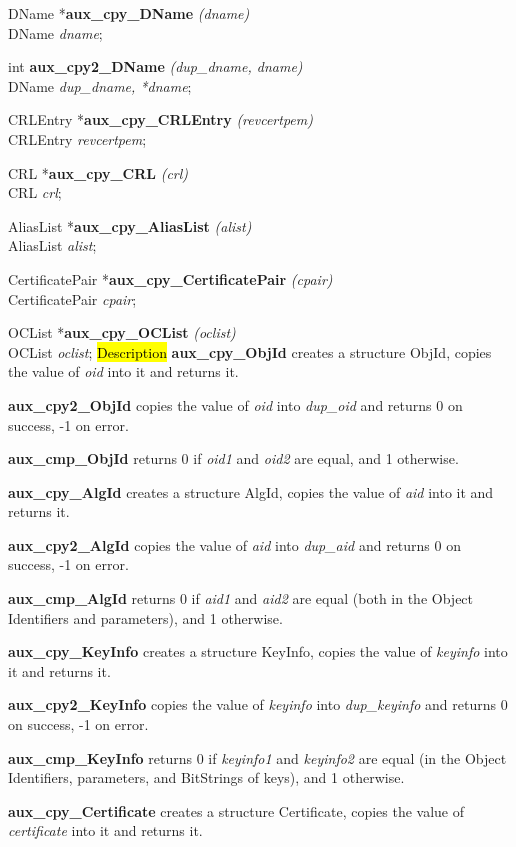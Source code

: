 DName *{\bf aux\_cpy\_DName} {\em  (dname)} \\
DName {\em *dname};

int {\bf aux\_cpy2\_DName} {\em (dup\_dname, dname)} \\
DName {\em *dup\_dname, *dname};

CRLEntry *{\bf aux\_cpy\_CRLEntry} {\em  (revcertpem)} \\
CRLEntry {\em *revcertpem};

CRL *{\bf aux\_cpy\_CRL} {\em  (crl)} \\
CRL {\em *crl};

AliasList *{\bf aux\_cpy\_AliasList} {\em  (alist)} \\
AliasList {\em *alist};

CertificatePair *{\bf aux\_cpy\_CertificatePair} {\em  (cpair)} \\
CertificatePair {\em *cpair};

OCList *{\bf aux\_cpy\_OCList} {\em  (oclist)} \\
OCList {\em *oclist};
\hl{Description}
{\bf aux\_cpy\_ObjId} creates a structure ObjId, copies the value
of {\em oid} into it and returns it.
                   
{\bf aux\_cpy2\_ObjId} copies the value of {\em oid} into {\em dup\_oid}
and returns 0 on success, -1 on error.

{\bf aux\_cmp\_ObjId} returns 0 if {\em oid1} and {\em oid2} are equal,
and 1 otherwise.

{\bf aux\_cpy\_AlgId} creates a structure AlgId, copies the value
of {\em aid} into it and returns it.

{\bf aux\_cpy2\_AlgId} copies the value of {\em aid} into {\em dup\_aid}
and returns 0 on success, -1 on error.

{\bf aux\_cmp\_AlgId} returns 0 if {\em aid1} and {\em aid2} are equal
(both in the Object Identifiers and parameters),
and 1 otherwise.

{\bf aux\_cpy\_KeyInfo} creates a structure KeyInfo, copies the value
of {\em keyinfo} into it and returns it.

{\bf aux\_cpy2\_KeyInfo} copies the value of {\em keyinfo} into {\em dup\_keyinfo}
and returns 0 on success, -1 on error.

{\bf aux\_cmp\_KeyInfo} returns 0
if {\em keyinfo1} and {\em keyinfo2} are equal
(in the Object Identifiers, parameters, and BitStrings of keys),
and 1 otherwise.

{\bf aux\_cpy\_Certificate} creates a structure Certificate, copies the value
of {\em certificate} into it and returns it.


